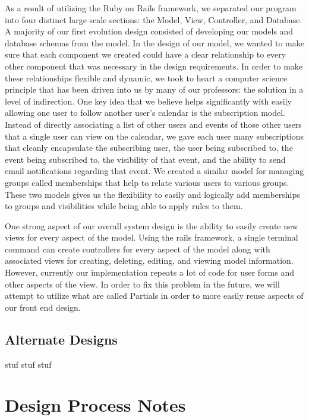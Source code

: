 \documentclass[11pt]{article}
\begin{document}
As a result of utilizing the Ruby on Rails framework, we separated our program into four distinct large scale sections: the Model, View, Controller, and Database.  A majority of our first evolution design consisted of developing our models and database schemas from the model.  In the design of our model, we wanted to make sure that each component we created could have a clear relationship to every other component that was necessary in the design requirements.  In order to make these relationships flexible and dynamic, we took to heart a computer science principle that has been driven into us by many of our professors: the solution in a level of indirection.  One key idea that we believe helps significantly with easily allowing one user to follow another user's calendar is the subscription model.  Instead of directly associating a list of other users and events of those other users that a single user can view on the calendar, we gave each user many subscriptions that cleanly encapsulate the subscribing user, the user being subscribed to, the event being subscribed to, the visibility of that event, and the ability to send email notifications regarding that event.  We created a similar model for managing groups called memberships that help to relate various users to various groups.  These two models gives us the flexibility to easily and logically add memberships to groups and visibilities while being able to apply rules to them.

One strong aspect of our overall system design is the ability to easily create new views for every aspect of the model.  Using the rails framework, a single terminal command can create controllers for every aspect of the model along with associated views for creating, deleting, editing, and viewing model information.  However, currently our implementation repeats a lot of code for user forms and other aspects of the view.  In order to fix this problem in the future, we will attempt to utilize what are called Partials in order to more easily reuse aspects of our front end design.

\subsection{Alternate Designs}

stuf stuf stuf

\section{Design Process Notes}
\end{document}
